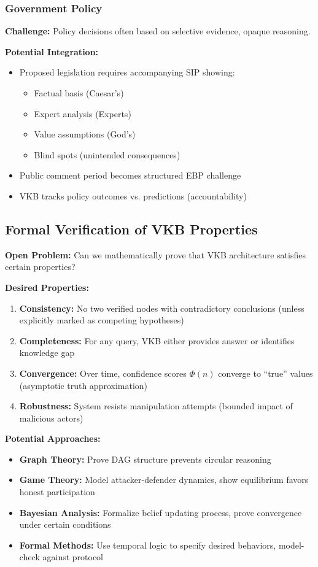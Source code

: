 \documentclass[11pt,a4paper]{article}
\theoremstyle{definition}
\theoremstyle{remark}
\newcommand{\VKB}{\textsc{VKB}}
\newcommand{\SIP}{\textsc{SIP}}
\newcommand{\EBP}{\textsc{EBP}}
\begin{document}
\subsubsection{Government Policy}

\textbf{Challenge:} Policy decisions often based on selective evidence, opaque reasoning.

\textbf{Potential Integration:}
\begin{itemize}
    \item Proposed legislation requires accompanying \SIP{} showing:
    \begin{itemize}
        \item Factual basis (Caesar's)
        \item Expert analysis (Experts)
        \item Value assumptions (God's)
        \item Blind spots (unintended consequences)
    \end{itemize}
    \item Public comment period becomes structured \EBP{} challenge
    \item \VKB{} tracks policy outcomes vs. predictions (accountability)
\end{itemize}

\subsection{Formal Verification of VKB Properties}

\textbf{Open Problem:} Can we mathematically prove that \VKB{} architecture satisfies certain properties?

\textbf{Desired Properties:}
\begin{enumerate}
    \item \textbf{Consistency:} No two verified nodes with contradictory conclusions (unless explicitly marked as competing hypotheses)
    \item \textbf{Completeness:} For any query, \VKB{} either provides answer or identifies knowledge gap
    \item \textbf{Convergence:} Over time, confidence scores $\Phi(n)$ converge to ``true'' values (asymptotic truth approximation)
    \item \textbf{Robustness:} System resists manipulation attempts (bounded impact of malicious actors)
\end{enumerate}

\textbf{Potential Approaches:}
\begin{itemize}
    \item \textbf{Graph Theory:} Prove DAG structure prevents circular reasoning
    \item \textbf{Game Theory:} Model attacker-defender dynamics, show equilibrium favors honest participation
    \item \textbf{Bayesian Analysis:} Formalize belief updating process, prove convergence under certain conditions
    \item \textbf{Formal Methods:} Use temporal logic to specify desired behaviors, model-check against protocol
\end{itemize}
\end{document}
